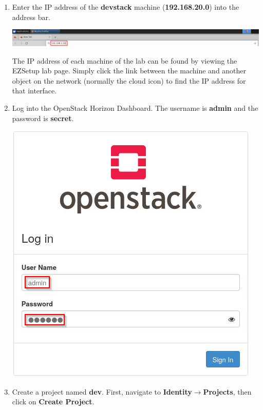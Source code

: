 \documentclass[letterpaper, 12pt]{article}
\begin{document}
\begin{enumerate}
    \item Enter the IP address of the \textbf{devstack} machine (\textbf{192.168.20.0}) into the address bar.
    
    \begin{center}
        \includegraphics[width=\linewidth]{images/part_1_step_6.png}
    \end{center}

    \begin{tipbox}{}
        The IP address of each machine of the lab can be found by viewing the EZSetup lab page. Simply click the link
        between the machine and another object on the network (normally the cloud icon) to find the IP address for that
        interface.
    \end{tipbox}

    \item Log into the OpenStack Horizon Dashboard. The username is \textbf{admin} and the password is \textbf{secret}.
    
    \begin{center}
        \includegraphics[scale=0.75]{images/part_1_step_7.png}
    \end{center}

    \item Create a project named \textbf{dev}. First, navigate to \textbf{Identity$\rightarrow$Projects}, then click on
    \textbf{Create Project}.


\end{enumerate}
\end{document}
